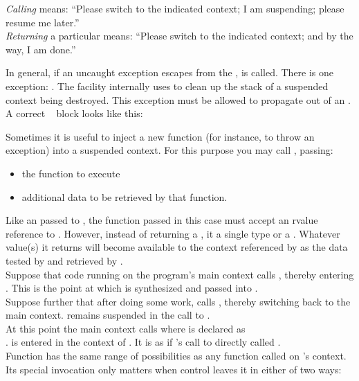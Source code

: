\emph{Calling} \contresume means: ``Please switch to the indicated context; I
am suspending; please resume me later.''\\

\emph{Returning} a particular \cont means: ``Please switch to the indicated
context; and by the way, I am done.''


\label{subsec:exceptions}
In general, if an uncaught exception escapes from
the \entryfn,  is called. There is one
exception: \unwindex. The \callcc facility internally uses \unwindex to clean
up the stack of a suspended context being destroyed. This exception must be
allowed to propagate out of an \entryfn.\\

A correct \entryfn\  block looks like this:


Sometimes it is useful to inject a new function (for instance, to throw an
exception) into a suspended context. For this purpose you may call
, passing:

\begin{itemize}
  \item the function to execute
  \item additional data to be retrieved by that function.
\end{itemize}

Like an \entryfn passed to \callcc, the function passed in this case must
accept an rvalue reference to \cont. However, instead of returning
a \cont, it  a single type or a . Whatever value(s)
it returns will become available to the context referenced by  as
the data tested by \dataavail and retrieved by \getdata.\\

Suppose that code running on the program's main context calls ,
thereby entering . This is the point at which  is synthesized
and passed into .\\
Suppose further that after doing some work,  calls ,
thereby switching back to the main context.  remains suspended
in the call to .\\
At this point the main context calls 
where  is declared as\\
.  is entered in the context of .
It is as if 's call to  directly called .\\
Function  has the same range of possibilities as any function called on
's context. Its special invocation only matters when control leaves it
in either of two ways:

